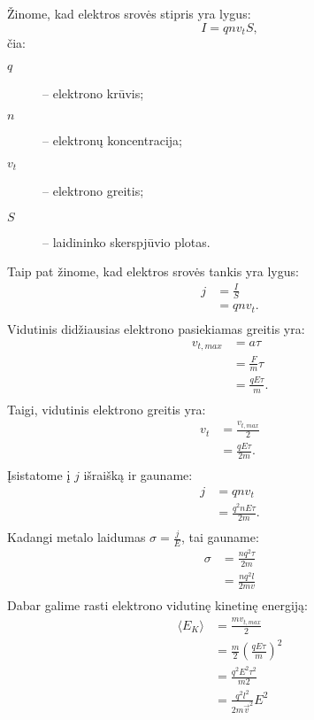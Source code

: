 Žinome, kad elektros srovės stipris yra lygus:
\begin{equation*}
  I = qnv_{t}S,
\end{equation*}
čia:
\begin{description}
  \item[$q$] – elektrono krūvis;
  \item[$n$] – elektronų koncentracija;
  \item[$v_{t}$] – elektrono greitis;
  \item[$S$] – laidininko skerspjūvio plotas.
\end{description}
Taip pat žinome, kad elektros srovės tankis yra lygus:
\begin{align*}
  j
  &= \frac{I}{S} \\
  &= qnv_{t}. \\
\end{align*}
Vidutinis didžiausias elektrono pasiekiamas greitis yra:
\begin{align*}
  v_{t,max}
  &= a\tau \\
  &= \frac{F}{m}\tau \\
  &= \frac{qE\tau}{m}. \\
\end{align*}
Taigi, vidutinis elektrono greitis yra:
\begin{align*}
  v_{t}
  &= \frac{v_{t,max}}{2} \\
  &= \frac{qE\tau}{2m}. \\
\end{align*}
Įsistatome į $j$ išraišką ir gauname:
\begin{align*}
  j
  &= qnv_{t} \\
  &= \frac{q^{2}nE\tau}{2m}. \\
\end{align*}
Kadangi metalo laidumas $\sigma = \frac{j}{E}$, tai gauname:
\begin{align*}
  \sigma
  &= \frac{nq^{2}\tau}{2m} \\
  &= \frac{nq^{2}l}{2mv} \\
\end{align*}
Dabar galime rasti elektrono vidutinę kinetinę energiją:
\begin{align*}
  \langle E_{K} \rangle
  &= \frac{mv_{t,max}}{2} \\
  &= \frac{m}{2} \left( \frac{qE\tau}{m} \right)^{2} \\
  &= \frac{q^{2}E^{2}\tau^{2}}{m2} \\
  &= \frac{q^{2}l^{2}}{2m\vec{v}^{2}}E^{2} \\
\end{align*}

